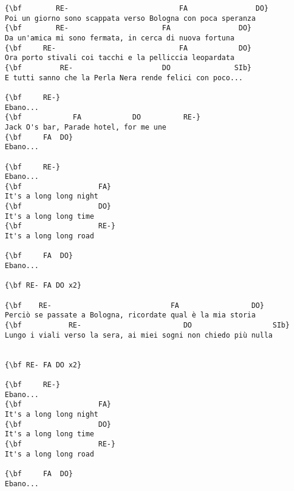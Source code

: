 \documentclass[a4paper]{article}
\begin{document}
\begin{Verbatim}[commandchars=\\\{\}]
{\bf        RE-                          FA                DO}
Poi un giorno sono scappata verso Bologna con poca speranza
{\bf        RE-                      FA                DO}
Da un'amica mi sono fermata, in cerca di nuova fortuna
{\bf     RE-                             FA            DO}
Ora porto stivali coi tacchi e la pelliccia leopardata
{\bf         RE-                     DO               SIb}
E tutti sanno che la Perla Nera rende felici con poco...

{\bf     RE-}
Ebano...
{\bf            FA            DO          RE-}
Jack O's bar, Parade hotel, for me une
{\bf     FA  DO}
Ebano...

{\bf     RE-}
Ebano...
{\bf                  FA}
It's a long long night
{\bf                  DO}
It's a long long time
{\bf                  RE-}
It's a long long road

{\bf     FA  DO}
Ebano...

{\bf RE- FA DO x2}

{\bf    RE-                            FA                 DO}
Perciò se passate a Bologna, ricordate qual è la mia storia
{\bf           RE-                        DO                   SIb}
Lungo i viali verso la sera, ai miei sogni non chiedo più nulla


{\bf RE- FA DO x2}

{\bf     RE-}
Ebano...
{\bf                  FA}
It's a long long night
{\bf                  DO}
It's a long long time
{\bf                  RE-}
It's a long long road

{\bf     FA  DO}
Ebano...
\end{Verbatim}
\newpage
\end{document}
